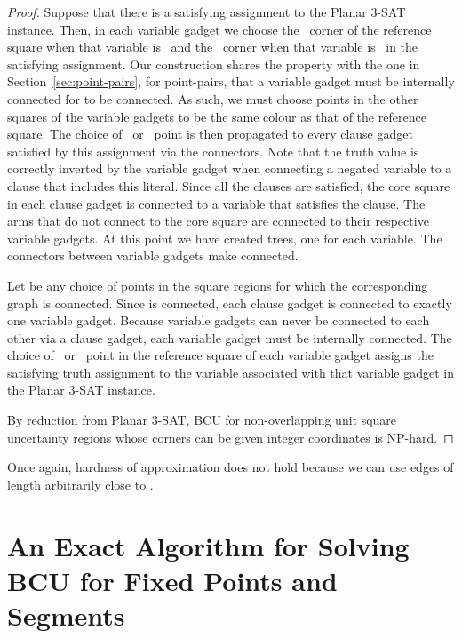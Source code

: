 \begin{proof}
Suppose that there is a satisfying assignment to the Planar 3-SAT
instance.  Then, in each variable gadget we choose the \bluecolour\
corner of the reference square when that variable is \true\ and the
\redcolour\ corner when that variable is \false\ in the satisfying
assignment.
Our construction shares the property with the one in
Section~\ref{sec:point-pairs}, for point-pairs, that a variable gadget
must be internally connected for  to be connected.  As such, we
must choose points in the other squares of the variable gadgets to be
the same colour as that of the reference square.
The choice of
\redcolour\ or \bluecolour\ point is then propagated to every clause
gadget satisfied by this assignment via the connectors.  Note that the
truth value is correctly inverted by the variable gadget when
connecting a negated variable to a clause that includes this literal.
Since all the clauses are satisfied, the core square in each clause
gadget is connected to a variable that satisfies the clause.  The arms
that do not connect to the core square are connected to their
respective variable gadgets.  At this point we have created  trees,
one for each variable.  The  connectors between variable gadgets
make  connected.

Let  be any choice of points in the square regions for which the corresponding graph  is connected.  Since  is connected, each clause gadget is connected to exactly one variable gadget.  Because variable gadgets can never be connected to each other via a clause gadget, each variable gadget must be internally connected.  The choice of \redcolour\ or \bluecolour\ point in the reference square of each variable gadget assigns the satisfying truth assignment to the variable associated with that variable gadget in the Planar 3-SAT instance.


By reduction from Planar 3-SAT, BCU for non-overlapping unit square uncertainty regions whose corners can be given integer coordinates is NP-hard.\hfill
\end{proof}

\noindent Once again, hardness of approximation does not hold because we can use
edges of length arbitrarily close to .

 

\makeatletter{}\section{An Exact Algorithm for Solving BCU for  Fixed Points and  Segments}\label{sec:exactAlgorithm}

